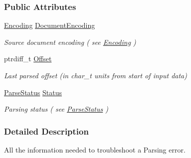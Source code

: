 \subsubsection*{Public Attributes}
\begin{DoxyCompactItemize}
\item 
\hypertarget{structphys_1_1xml_1_1ParseResult_a95c39cf7a95875a4cd9708656a976dfc}{
\hyperlink{namespacephys_1_1xml_a420f5de782438f88160321385bea2015}{Encoding} \hyperlink{structphys_1_1xml_1_1ParseResult_a95c39cf7a95875a4cd9708656a976dfc}{DocumentEncoding}}
\label{structphys_1_1xml_1_1ParseResult_a95c39cf7a95875a4cd9708656a976dfc}

\begin{DoxyCompactList}\small\item\em Source document encoding ( see \hyperlink{namespacephys_1_1xml_a420f5de782438f88160321385bea2015}{Encoding} ) \item\end{DoxyCompactList}\item 
\hypertarget{structphys_1_1xml_1_1ParseResult_a30b2a5fa6ceae01ab30c6ff48273ce41}{
ptrdiff\_\-t \hyperlink{structphys_1_1xml_1_1ParseResult_a30b2a5fa6ceae01ab30c6ff48273ce41}{Offset}}
\label{structphys_1_1xml_1_1ParseResult_a30b2a5fa6ceae01ab30c6ff48273ce41}

\begin{DoxyCompactList}\small\item\em Last parsed offset (in char\_\-t units from start of input data) \item\end{DoxyCompactList}\item 
\hypertarget{structphys_1_1xml_1_1ParseResult_a1bf9dfeebdb07656723bbaf18ab612b5}{
\hyperlink{namespacephys_1_1xml_ae7aabb879b21c73d8183a54470f8917f}{ParseStatus} \hyperlink{structphys_1_1xml_1_1ParseResult_a1bf9dfeebdb07656723bbaf18ab612b5}{Status}}
\label{structphys_1_1xml_1_1ParseResult_a1bf9dfeebdb07656723bbaf18ab612b5}

\begin{DoxyCompactList}\small\item\em Parsing status ( see \hyperlink{namespacephys_1_1xml_ae7aabb879b21c73d8183a54470f8917f}{ParseStatus} ) \item\end{DoxyCompactList}\end{DoxyCompactItemize}


\subsubsection{Detailed Description}
All the information needed to troubleshoot a Parsing error. 

